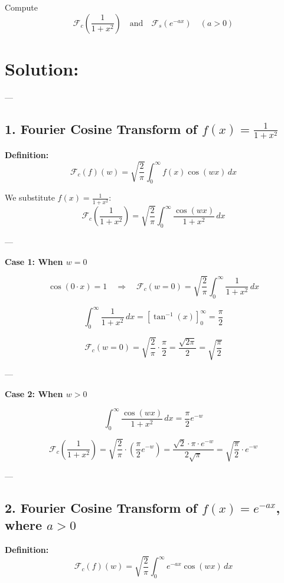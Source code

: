 \documentclass{article}
\begin{document}
\noindent
Compute
\[
\mathcal{F}_c\left( \frac{1}{1 + x^2} \right)
\quad \text{and} \quad
\mathcal{F}_s\left( e^{-ax} \right) \quad (a > 0)
\]

\section*{Solution:}
---

\subsection*{1. Fourier Cosine Transform of \( f(x) = \frac{1}{1 + x^2} \)}

\textbf{Definition:}
\[
\mathcal{F}_c(f)(w) = \sqrt{\frac{2}{\pi}} \int_0^\infty f(x) \cos(wx) \, dx
\]

We substitute \( f(x) = \frac{1}{1 + x^2} \):
\[
\mathcal{F}_c\left( \frac{1}{1 + x^2} \right) = \sqrt{\frac{2}{\pi}} \int_0^\infty \frac{\cos(wx)}{1 + x^2} \, dx
\]

---

\textbf{Case 1: When \( w = 0 \)}

\[
\cos(0 \cdot x) = 1 \quad \Rightarrow \quad \mathcal{F}_c(w = 0) = \sqrt{\frac{2}{\pi}} \int_0^\infty \frac{1}{1 + x^2} \, dx
\]

\[
\int_0^\infty \frac{1}{1 + x^2} \, dx = \left[ \tan^{-1}(x) \right]_0^\infty = \frac{\pi}{2}
\]

\[
\mathcal{F}_c(w = 0) = \sqrt{\frac{2}{\pi}} \cdot \frac{\pi}{2}
= \frac{\sqrt{2\pi}}{2}
= \boxed{ \sqrt{ \frac{\pi}{2} } }
\]

---

\textbf{Case 2: When \( w > 0 \)}

\[
\int_0^\infty \frac{\cos(wx)}{1 + x^2} \, dx = \frac{\pi}{2} e^{-w}
\]

\[
\mathcal{F}_c\left( \frac{1}{1 + x^2} \right)
= \sqrt{\frac{2}{\pi}} \cdot \left( \frac{\pi}{2} e^{-w} \right)
= \frac{\sqrt{2} \cdot \pi \cdot e^{-w}}{2\sqrt{\pi}}
= \boxed{ \sqrt{ \frac{\pi}{2} } \cdot e^{-w} }
\]

---

\subsection*{2. Fourier Cosine Transform of \( f(x) = e^{-a x} \), where \( a > 0 \)}

\textbf{Definition:}
\[
\mathcal{F}_c(f)(w) = \sqrt{\frac{2}{\pi}} \int_0^\infty e^{-a x} \cos(wx) \, dx
\]
\end{document}
